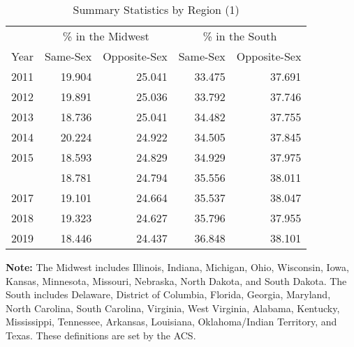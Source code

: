 \begin{table}[h]

\caption{Summary Statistics by Region (1)}
\label{region_1} %
\centering
\begin{tabular}[t]{rrrrr}
\toprule
\multicolumn{1}{c}{ } & \multicolumn{2}{c}{\% in the Midwest} & \multicolumn{2}{c}{\% in the South} \\
\cmidrule(l{3pt}r{3pt}){2-3} \cmidrule(l{3pt}r{3pt}){4-5}
Year & Same-Sex & Opposite-Sex & Same-Sex & Opposite-Sex\\
\midrule
2011 & 19.904 & 25.041 & 33.475 & 37.691\\
2012 & 19.891 & 25.036 & 33.792 & 37.746\\
2013 & 18.736 & 25.041 & 34.482 & 37.755\\
2014 & 20.224 & 24.922 & 34.505 & 37.845\\
2015 & 18.593 & 24.829 & 34.929 & 37.975\\
\addlinespace
2016 & 18.781 & 24.794 & 35.556 & 38.011\\
2017 & 19.101 & 24.664 & 35.537 & 38.047\\
2018 & 19.323 & 24.627 & 35.796 & 37.955\\
2019 & 18.446 & 24.437 & 36.848 & 38.101\\
\bottomrule
\end{tabular}
\vspace{0.5em}
\begin{minipage}{0.85\textwidth} %
\small \textbf{Note:} The Midwest includes Illinois, Indiana, Michigan, Ohio, Wisconsin, Iowa, Kansas, Minnesota, Missouri, Nebraska, North Dakota, and South Dakota. The South includes Delaware, District of Columbia, Florida, Georgia, Maryland, North Carolina, South Carolina, Virginia, West Virginia, Alabama, Kentucky, Mississippi, Tennessee, Arkansas, Louisiana, Oklahoma/Indian Territory, and Texas. These definitions are set by the ACS.
\end{minipage}
\end{table}
